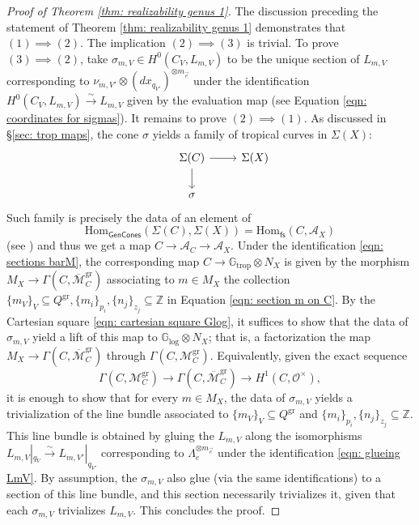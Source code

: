 \documentclass{article}
\def\oM{\overline{\mathcal{M}}}
\def\Z{\mathbb{Z}}
\newcommand{\gr}{\mathrm{gr}}
\begin{document}
\begin{proof}[Proof of Theorem \ref{thm: realizability genus 1}]
    The discussion preceding the statement of Theorem \ref{thm: realizability genus 1} demonstrates that $(1) \implies (2)$. The implication $(2) \implies (3)$ is trivial. To prove $(3) \implies (2)$, take $\sigma_{m,V} \in H^0(C_V,L_{m,V})$ to be the unique section of $L_{m,V}$ corresponding to $\nu_{m,V'} \otimes (dx_{q_{V'}})^{\otimes m_{\vec{e}}}$ under the identification $H^0(C_V,L_{m,V}) \xrightarrow{\sim} L_{m,V}$ given by the evaluation map (see Equation \eqref{eqn: coordinates for sigmas}). It remains to prove $(2) \implies (1)$. As discussed in \S\ref{sec: trop maps}, the cone $\sigma$ yields a family of tropical curves in $\Sigma(X)$:
    \[
        \begin{tikzcd}
        & \Sigma(C) \arrow[r] \arrow[d] & \Sigma(X) \\
        & \sigma 
    \end{tikzcd}
    \]
     Such family is precisely the data of an element of 
    $$
    \mathrm{Hom}_{\mathsf{GenCones}}(\Sigma(C), \Sigma(X))=\mathrm{Hom}_{\mathsf{fs}}(C, \mathcal{A}_X)
    $$
    (see \cite[Proposition 2.10]{ACGSI}) and thus we get a map $C \to \mathcal{A}_C \to \mathcal{A}_X$. Under the identification \eqref{eqn: sections barM}, the corresponding map $C \to \mathbb{G}_{\mathrm{trop}} \otimes N_X$ is given by the morphism $M_X \to \Gamma(C,\oM_C^{\gr})$ associating to $m \in M_X$ the collection $\{m_V\}_V \subseteq Q^{\gr}, \{m_i\}_{p_i}, \{n_j\}_{z_j} \subseteq \Z$ in Equation \eqref{eqn: section m on C}. By the Cartesian square \eqref{eqn: cartesian square Glog}, it suffices to show that the data of $\sigma_{m,V}$ yield a lift of this map to $\mathbb{G}_{\mathrm{log}} \otimes N_X$; that is, a factorization the map $M_X \to \Gamma(C, \oM_C^{\gr})$ through $\Gamma(C, \mathcal{M}_C^{\gr})$. Equivalently, given the exact sequence$$\Gamma(C, \mathcal{M}_C^{\gr}) \to \Gamma(C, \oM_C^{\gr}) \to H^1(C, \mathcal{O}^{\times}),$$ it is enough to show that for every $m \in M_X$, the data of $\sigma_{m,V}$ yields a trivialization of the line bundle associated to $\{m_V\}_V \subseteq Q^{\gr}$ and $\{m_i\}_{p_i}, \{n_j\}_{z_j} \subseteq \mathbb{Z}$. This line bundle is obtained by gluing the $L_{m,V}$ along the isomorphisms $L_{m,V}|_{q_V} \xrightarrow{\sim} L_{m,V'}|_{q_{V'}}$ corresponding to $\Lambda_e^{\otimes m_{\vec{e}}}$ under the identification \eqref{eqn: glueing LmV}. By assumption, the $\sigma_{m,V}$ also glue (via the same identifications) to a section of this line bundle, and this section necessarily trivializes it, given that each $\sigma_{m,V}$ trivializes $L_{m,V}$. This concludes the proof.
\end{proof}
\end{document}
